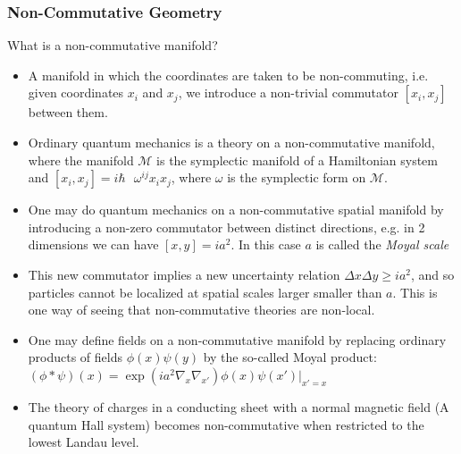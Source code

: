 \documentclass[8pt,aspectratio=169]{beamer}
\begin{document}
\begin{frame}
\frametitle{Non-Commutative Geometry}

What is a non-commutative manifold?

\begin{itemize}

\item A manifold in which the coordinates are taken to be non-commuting, i.e. given coordinates $x_i$ and $x_j$, we introduce a non-trivial commutator $[x_i,x_j]$ between them.

\item Ordinary quantum mechanics is a theory on a non-commutative manifold, where the manifold $\mathcal{M}$ is the symplectic manifold of a Hamiltonian system and $[x_i,x_j] = i \hbar \text{ } \omega^{ij} x_i x_j$, where $\omega$ is the symplectic form on $\mathcal{M}$.

\item One may do quantum mechanics on a non-commutative spatial manifold by introducing a non-zero commutator between distinct directions, e.g. in 2 dimensions we can have $[x,y] = i a^2$. In this case $a$ is called the \textit{Moyal scale}

\item This new commutator implies a new uncertainty relation $\Delta x \Delta y \geq i a^2$, and so particles cannot be localized at spatial scales larger smaller than $a$. This is one way of seeing that non-commutative theories are non-local.

\item One may define fields on a non-commutative manifold by replacing ordinary products of fields $\phi(x) \psi(y)$ by the so-called Moyal product: $(\phi * \psi)(x) = \exp(i a^2 \nabla_x \nabla_{x'}) \phi(x) \psi(x') \bigg|_{x'=x}$

\item The theory of charges in a conducting sheet with a normal magnetic field (A quantum Hall system) becomes non-commutative when restricted to the lowest Landau level.

\end{itemize}

\end{frame}
\end{document}
